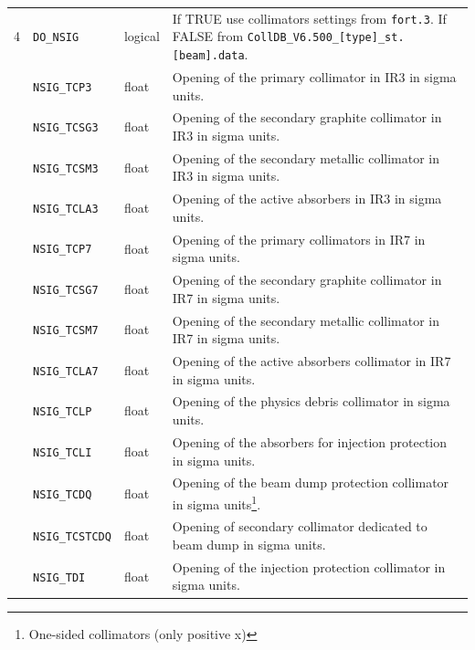 \begin{center}
\begin{longtable}{| p{0.5cm} | p{2.4cm} | p{1.2cm} | >{\raggedright\arraybackslash}p{11.4cm}|}
    4   & \texttt{DO\_NSIG}      & logical & If TRUE use collimators settings from \texttt{fort.3}. If FALSE from \texttt{CollDB\_V6.500\_[type]\_st.[beam].data}. \\
        \cline{2-4}
        & \texttt{NSIG\_TCP3}    & float   & Opening of the primary collimator\index{primary collimator} in IR3 in sigma units. \\
        \cline{2-4}
        & \texttt{NSIG\_TCSG3}   & float   & Opening of the secondary graphite collimator in IR3 in sigma units\index{secondary collimator}. \\
        \cline{2-4}
        & \texttt{NSIG\_TCSM3}   & float   & Opening of the secondary metallic collimator in IR3 in sigma units\index{secondary collimator}. \\
        \cline{2-4}
        & \texttt{NSIG\_TCLA3}   & float   & Opening of the active absorbers in IR3 in sigma units\index{absorbers}. \\
        \cline{2-4}
        & \texttt{NSIG\_TCP7}    & float   & Opening of the primary collimators\index{primary collimator} in IR7 in sigma units. \\
        \cline{2-4}
        & \texttt{NSIG\_TCSG7}   & float   & Opening of the secondary graphite collimator in IR7 in sigma units\index{secondary collimator}. \\
        \cline{2-4}
        & \texttt{NSIG\_TCSM7}   & float   & Opening of the secondary metallic collimator in IR7 in sigma units\index{secondary collimator}. \\
        \cline{2-4}
        & \texttt{NSIG\_TCLA7}   & float   & Opening of the active absorbers collimator\index{absorbers} in IR7 in sigma units. \\
        \cline{2-4}
        & \texttt{NSIG\_TCLP}    & float   & Opening of the physics debris collimator in sigma units. \\
        \cline{2-4}
        & \texttt{NSIG\_TCLI}    & float   & Opening of the absorbers for injection protection in sigma units\index{absorbers}. \\
        \cline{2-4}
        & \texttt{NSIG\_TCDQ}    & float   & Opening of the beam dump protection collimator in sigma units\footnote{One-sided collimators (only positive x)}. \\
        \cline{2-4}
        & \texttt{NSIG\_TCSTCDQ} & float   & Opening of secondary collimator dedicated to beam dump in sigma units\index{secondary collimator}. \\
        \cline{2-4}
        & \texttt{NSIG\_TDI}     & float   & Opening of the injection protection collimator in sigma units. \\
    \hline


\end{longtable}
\end{center}
